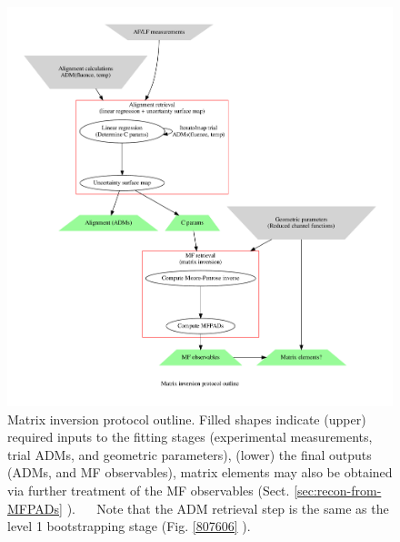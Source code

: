 \documentclass[10pt]{article}
\begin{document}
\begin{figure}[]
\begin{center}
\includegraphics[width=\textwidth,height=\dimexpr\textheight-4\baselineskip-\abovecaptionskip-\belowcaptionskip\relax,keepaspectratio]{figures/matrix_inversion_flowchart_300822.gv.pdf}
\caption{Matrix inversion protocol outline. Filled shapes indicate (upper) required inputs to the fitting stages (experimental measurements, trial ADMs, and geometric parameters), (lower) the final outputs (ADMs, and MF observables), matrix elements may also be obtained via further treatment of the MF observables (Sect. \ref{sec:recon-from-MFPADs} ).    Note that the ADM retrieval step is the same as the level 1 bootstrapping stage (Fig. \ref{807606} ).\label{731792}}
\end{center}
\end{figure}
\end{document}

